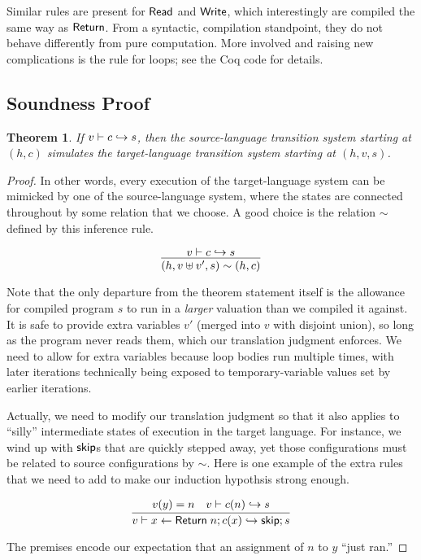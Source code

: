 \documentclass{amsbook}
\newtheorem{theorem}{Theorem}[chapter]
\theoremstyle{definition}
\theoremstyle{remark}
\numberwithin{section}{chapter}
\numberwithin{equation}{chapter}
\begin{document}
Similar rules are present for $\mathsf{Read}$ and $\mathsf{Write}$, which interestingly are compiled the same way as $\mathsf{Return}$.
From a syntactic, compilation standpoint, they do not behave differently from pure computation.
More involved and raising new complications is the rule for loops; see the Coq code for details.

\subsection{Soundness Proof}

\begin{theorem}\label{dscompsim}
  If $v \vdash c \hookrightarrow s$, then the source-language transition system starting at $(h, c)$ simulates the target-language transition system starting at $(h, v, s)$.
\end{theorem}
\begin{proof}
  In other words, every execution of the target-language system can be mimicked by one of the source-language system, where the states are connected throughout by some relation that we choose.
  A good choice is the relation $\sim$ defined by this inference rule.

  $$\infer{(h, v \uplus v', s) \sim (h, c)}{
    \dscomp{v}{c}{s}
  }$$

  Note that the only departure from the theorem statement itself is the allowance for compiled program $s$ to run in a \emph{larger} valuation than we compiled it against.
  It is safe to provide extra variables $v'$ (merged into $v$ with disjoint union), so long as the program never reads them, which our translation judgment enforces.
  We need to allow for extra variables because loop bodies run multiple times, with later iterations technically being exposed to temporary-variable values set by earlier iterations.

  Actually, we need to modify our translation judgment so that it also applies to ``silly'' intermediate states of execution in the target language.
  For instance, we wind up with $\mathsf{skip}$s that are quickly stepped away, yet those configurations must be related to source configurations by $\sim$.
  Here is one example of the extra rules that we need to add to make our induction hypothsis strong enough.

  $$\infer{\dscomp{v}{x \leftarrow \mt{Return} \; n; c(x)}{\mt{skip}; s}}{
    v(y) = n
    & \dscomp{v}{c(n)}{s}
  }$$

  The premises encode our expectation that an assignment of $n$ to $y$ ``just ran.''
\end{proof}
\end{document}
